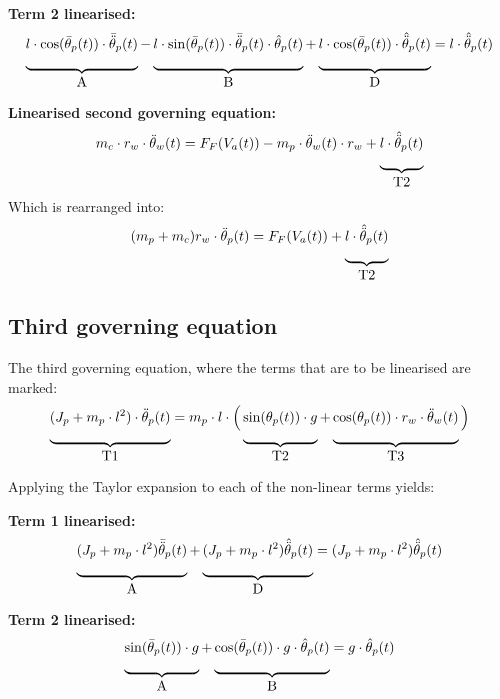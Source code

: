 \textbf{Term 2 linearised:}
\begin{align}
\underbrace{l \cdot \cos(\bar{\theta}_p(t))\cdot \bar{\ddot\theta}_p(t)\rule[-12pt]{0pt}{5pt}}_{\mbox{A}} - \underbrace{l \cdot \sin(\bar{\theta}_p(t)) \cdot \bar{\ddot \theta}_p(t) \cdot \hat{\theta}_p(t)\rule[-12pt]{0pt}{5pt}}_{\mbox{B}} + \underbrace{l \cdot \cos(\bar{\theta}_p(t))\cdot \hat{\ddot \theta}_p(t)\rule[-12pt]{0pt}{5pt}}_{\mbox{D}} = l \cdot \hat{\ddot \theta}_p(t)
\end{align}

\textbf{Linearised second governing equation:}
\begin{equation}
m_c \cdot r_w \cdot \ddot \theta_w(t) = F_F(V_a(t)) - m_p \cdot \ddot \theta_w(t) \cdot r_w + \underbrace{l \cdot \hat{\ddot \theta}_p(t)\rule[-12pt]{0pt}{5pt}}_{\mbox{T2}}
\end{equation}
Which is rearranged into:
\begin{equation}
(m_p + m_c)r_w \cdot \ddot \theta_p(t) = F_F(V_a(t)) + \underbrace{l \cdot \hat{\ddot \theta}_p(t)\rule[-12pt]{0pt}{5pt}}_{\mbox{T2}}
\end{equation}
\subsection*{Third governing equation}
The third governing equation, where the terms that are to be linearised are marked:
\begin{align}
\underbrace{(J_p+m_p\cdot l^2)\cdot \ddot \theta_p(t)\rule[-12pt]{0pt}{5pt}}_{\mbox{T1}} = m_p \cdot l \cdot \Big(\underbrace{\sin(\theta_p(t)) \cdot g\rule[-12pt]{0pt}{5pt}}_{\mbox{T2}} + \underbrace{\cos(\theta_p(t)) \cdot r_w \cdot \ddot \theta_w(t)\rule[-12pt]{0pt}{5pt}}_{\mbox{T3}}\Big)
\label{eq:appModel}
\end{align}

Applying the Taylor expansion to each of the non-linear terms yields:

\textbf{Term 1 linearised:}
\begin{align*}
\underbrace{(J_p + m_p \cdot l^2)\bar{\ddot \theta}_p(t)\rule[-12pt]{0pt}{5pt}}_{\mbox{A}} + \underbrace{(J_p + m_p \cdot l^2)\hat{\ddot \theta}_p(t)\rule[-12pt]{0pt}{5pt}}_{\mbox{D}} = (J_p + m_p \cdot l^2)\hat{\ddot \theta}_p(t)
\end{align*}

\textbf{Term 2 linearised:}
\begin{align*}
\underbrace{\sin(\bar{\theta}_p(t)) \cdot g\rule[-12pt]{0pt}{5pt}}_{\mbox{A}} + \underbrace{\cos(\bar{\theta}_p(t)) \cdot g \cdot \hat{\theta}_p(t)\rule[-12pt]{0pt}{5pt}}_{\mbox{B}} = g \cdot \hat{\theta}_p(t)
\end{align*}

